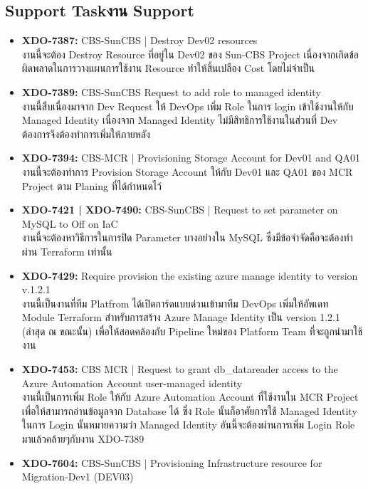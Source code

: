 \subsection{\ifenglish Support Task\else งาน Support\fi}
\begin{itemize}
      \item \textbf{XDO-7387:} CBS-SunCBS | Destroy Dev02 resources \\
            งานนี้จะต้อง Destroy Resource ที่อยู่ใน Dev02 ของ Sun-CBS Project เนื่องจากเกิดข้อผิดพลาดในการวางแผนการใช้งาน Resource ทำให้สิ้นเปลือง Cost โดยไม่จำเป็น
      \item \textbf{XDO-7389:} CBS-SunCBS Request to add role to managed identity \\
            งานนี้สืบเนื่องมาจาก Dev Request ให้ DevOps เพิ่ม Role ในการ login เข้าใช้งานให้กับ Managed Identity เนื่องจาก Managed Identity ไม่มีสิทธิการใช้งานในส่วนที่ Dev ต้องการจึงต้องทำการเพิ่มให้ภายหลัง
      \item \textbf{XDO-7394:} CBS-MCR | Provisioning Storage Account for Dev01 and QA01 \\
            งานนี้จะต้องทำการ Provision Storage Account ให้กับ Dev01 และ QA01 ของ MCR Project ตาม Planing ที่ได้กำหนดไว้
      \item \textbf{XDO-7421 | XDO-7490:} CBS-SunCBS | Request to set parameter on MySQL to Off on IaC\\
            งานนี้จะต้องหาวิธีการในการปิด Parameter บางอย่างใน MySQL ซึ่งมีข้อจำจัดคือจะต้องทำผ่าน Terraform เท่านั้น
      \item \textbf{XDO-7429:} Require provision the existing azure manage identity to version v.1.2.1\\
            งานนี้เป็นงานที่ทีม Platfrom ได้เปิดการ์ดแบบด่วนเข้ามาทีม DevOps เพิ่มให้อัพเดท Module Terraform สำหรับการสร้าง Azure Manage Identity เป็น version 1.2.1 (ล่าสุด ณ ขณะนั้น) เพื่อให้สอดคล้องกับ Pipeline ใหม่ของ Platform Team ที่จะถูกนำมาใช้งาน
      \item \textbf{XDO-7453:} CBS MCR | Request to grant db\_datareader access to the Azure Automation Account user-managed identity\\
            งานนี้เป็นการเพิ่ม Role ให้กับ Azure Automation Account ที่ใช้งานใน MCR Project เพื่อให้สามารถอ่านข้อมูลจาก Database ได้ ซึ่ง Role นั้นก็อาศัยการใช้ Managed Identity ในการ Login นั้นหมายความว่า Managed Identity อันนี้จะต้องผ่านการเพิ่ม Login Role มาแล้วคล้ายๆกับงาน XDO-7389
      \item \textbf{XDO-7604:} CBS-SunCBS | Provisioning Infrastructure resource for Migration-Dev1 (DEV03)\\

\end{itemize}

